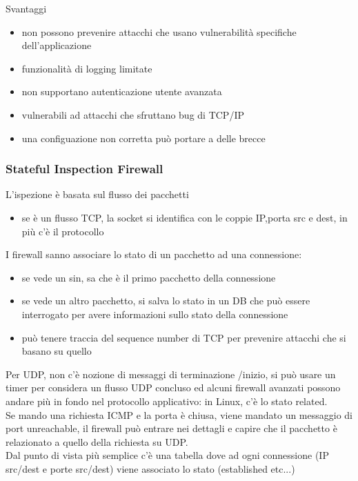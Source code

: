 \documentclass[12pt, oneside]{extbook} %
\begin{document}
Svantaggi
\begin{itemize}
\item non possono prevenire attacchi che usano vulnerabilità specifiche dell'applicazione
\item funzionalità di logging limitate
\item non supportano autenticazione utente avanzata
\item vulnerabili ad attacchi che sfruttano bug di TCP/IP
\item una configuazione non corretta può portare a delle brecce
\end{itemize}

\subsubsection{Stateful Inspection Firewall}
L'ispezione è basata sul flusso dei pacchetti
\begin{itemize}
\item se è un flusso TCP, la socket si identifica con le coppie IP,porta src e dest, in più c'è il protocollo
\end{itemize}
I firewall sanno associare lo stato di un pacchetto ad una connessione:
\begin{itemize}
\item se vede un sin, sa che è il primo pacchetto della connessione
\item se vede un altro pacchetto, si salva lo stato in un DB che può essere interrogato per avere informazioni sullo stato della connessione
\item può tenere traccia del sequence number di TCP per prevenire attacchi che si basano su quello
\end{itemize}
Per UDP, non c'è nozione di messaggi di terminazione /inizio, si può usare un timer per considera un flusso UDP concluso ed alcuni firewall avanzati possono andare più in fondo nel protocollo applicativo: in Linux, c'è lo stato related.
\\Se mando una richiesta ICMP e la porta è chiusa, viene mandato un messaggio di port unreachable, il firewall può entrare nei dettagli e capire che il pacchetto è relazionato a quello della richiesta su UDP.
\\Dal punto di vista più semplice c'è una tabella dove ad ogni connessione (IP src/dest e porte src/dest) viene associato lo stato (established etc...)
\end{document}
